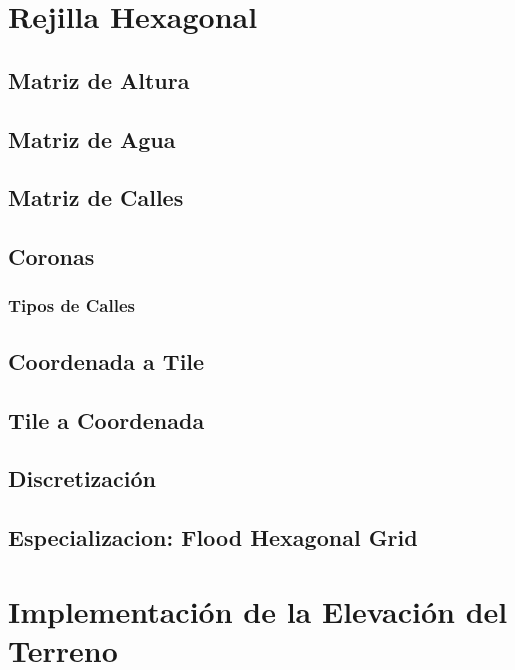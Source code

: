 \section*{Rejilla Hexagonal}
\subsection*{Matriz de Altura}
\subsection*{Matriz de Agua}
\subsection*{Matriz de Calles}
\subsection*{Coronas}
\subsubsection*{Tipos de Calles}
\subsection*{Coordenada a Tile}
\subsection*{Tile a Coordenada}
\subsection*{Discretización}
\subsection*{Especializacion: Flood Hexagonal Grid}
\section*{Implementación de la Elevación del Terreno}
